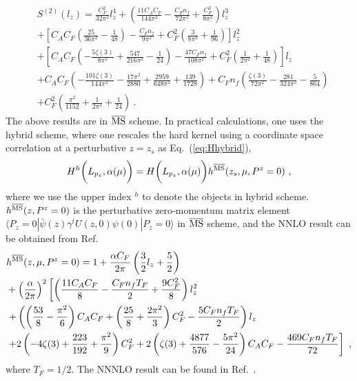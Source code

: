 \documentclass[a4paper,11pt]{article}
\begin{document}
\begin{align}
&S^{(2)}(l_z) = \frac{C_F^2}{32 \pi ^2}l_z^4 + \left(\frac{11 C_A C_F}{144 \pi ^2}-\frac{C_F n_f}{72 \pi ^2}+\frac{C_F^2}{8 \pi^2}\right)l_z^3 \nonumber\\
&+ \left[ C_A C_F \left(\frac{25}{36 \pi ^2}-\frac{1}{48}\right)
-\frac{C_F n_f}{9 \pi ^2}
+ C_F^2 \left(\frac{3}{8 \pi ^2}+\frac{1}{96}\right) \right]l_z^2 \nonumber\\
&+ \left[C_A C_F \left(-\frac{5 \zeta(3)}{8 \pi ^2}+\frac{547 }{216 \pi ^2}-\frac{1}{24}\right)
-\frac{47 C_F n_f}{108 \pi ^2}
+C_F^2 \left(\frac{1}{2 \pi^2}+\frac{1}{48}\right) \right] l_z \nonumber\\
& + C_A C_F\left(-\frac{101 \zeta(3)}{144 \pi ^2}-\frac{17 \pi^2}{2880}+\frac{2959}{648\pi ^2}+\frac{139}{1728}\right)
+ C_F n_f \left(\frac{\zeta(3)}{72 \pi ^2}-\frac{281}{324\pi ^2}-\frac{5}{864}\right)\nonumber\\
&+C_F^2 \left( \frac{\pi ^2}{1152}+\frac{1}{2 \pi^2}+\frac{1}{24} \right) \ . 
\end{align}
The above results are in $\overline{\rm MS}$ scheme. In practical calculations, one uses the hybrid scheme, where one rescales the hard kernel using a coordinate space correlation at a perturbative $z=z_s$ as Eq.~(\ref{eq:Hhybrid}),
\begin{align}
H^{h} \bigg(L_{p_z},\alpha(\mu)\bigg) =  H\bigg(L_{p_z},\alpha(\mu)\bigg) h^{\rm \overline{MS}}(z_s,\mu,P^z=0) \ ,
\end{align}
where we use the upper index $^{h}$ to denote the objects in hybrid scheme. $h^{\rm \overline{MS}}(z,P^z=0)$ is the perturbative zero-momentum matrix element $\langle P_z=0 | \bar{\psi}(z) \gamma^{t} U(z,0) \psi (0) |P_z=0 \rangle$ in $\overline{\rm MS}$ scheme, and the NNLO result can be obtained from Ref.~\cite{Li:2020xml}
\begin{align}\label{eq:p0m}
&h^{\rm \overline{MS}}(z,\mu,P^z=0) 
=1+\frac{\alpha C_{F}}{2 \pi}\left(\frac{3}{2} l_z +\frac{5}{2}\right) \nonumber\\
&+\left(\frac{\alpha}{2\pi}\right)^2\left[\left(\frac{11 C_A C_F}{8}-\frac{C_F n_f T_F}{2}+\frac{9 C_F^2}{8}\right) l_z^2 \right.\nonumber\\
&\left.+\left(\left(\frac{53}{8}-\frac{\pi ^2}{6}\right) C_A C_F+\left(\frac{25}{8}+\frac{2\pi ^2}{3}\right) C_F^2 -\frac{5 C_F n_f T_F}{2}\right) l_z \right. \nonumber\\
&\left.+2 \left(-4 \zeta(3) +\frac{223}{192} +\frac{\pi^2}{9}\right) C_F^2 +2\left(\zeta(3) +\frac{4877}{576}-\frac{5\pi ^2}{24}\right) C_A C_F-\frac{469 C_F n_f T_F}{72}\right] \  , 
\end{align}
where $T_F=1/2$. The NNNLO result can be found in Ref.~\cite{Cheng:2024wyu}.
\end{document}
